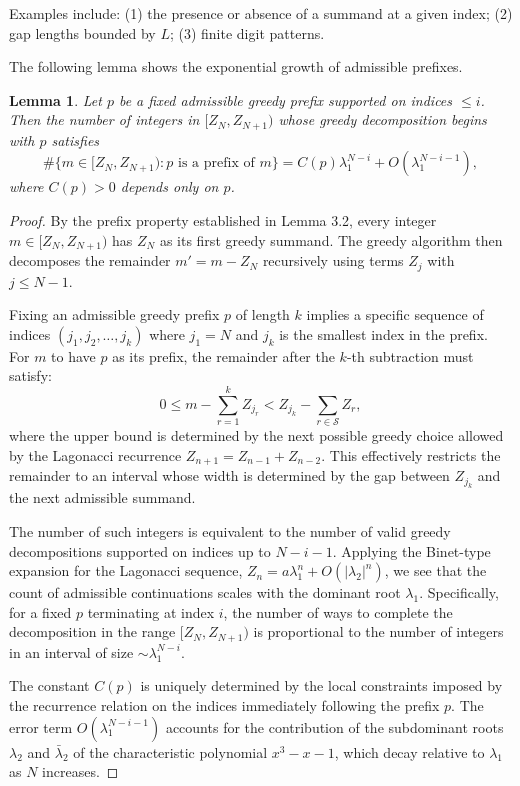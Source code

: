 \documentclass[11pt]{amsart}
\theoremstyle{plain}
\numberwithin{equation}{section} %
\newtheorem{lemma}[thm]{Lemma}
\numberwithin{table}{section} %
\numberwithin{figure}{section}
\begin{document}
	Examples include:
	(1) the presence or absence of a summand at a given index; (2) gap lengths bounded by $L$;
	(3) finite digit patterns.
	
	
	The following lemma shows the exponential growth of admissible prefixes.
	
	\begin{lemma}
		\label{lem:PrefixGrowth}
		Let $p$ be a fixed admissible greedy prefix supported on indices $\le i$. Then the number of integers in $[Z_{N}, Z_{N+1})$ whose greedy decomposition begins with $p$ satisfies
		\[
		\#\{m \in [Z_{N}, Z_{N+1}) : p \text{ is a prefix of } m\} = C(p) \lambda_1^{N-i} + O(\lambda_1^{N-i-1}),
		\]
		where $C(p) > 0$ depends only on $p$.
	\end{lemma}
	
	\begin{proof}
		By the prefix property established in Lemma 3.2, every integer $m \in [Z_{N}, Z_{N+1})$ has $Z_N$ as its first greedy summand. The greedy algorithm then decomposes the remainder $m' = m - Z_N$ recursively using terms $Z_j$ with $j \le N-1$.
		
		Fixing an admissible greedy prefix $p$ of length $k$ implies a specific sequence of indices $(j_1, j_2, \dots, j_k)$ where $j_1 = N$ and $j_k$ is the smallest index in the prefix. For $m$ to have $p$ as its prefix, the remainder after the $k$-th subtraction must satisfy:
		\[
		0 \le m - \sum_{r=1}^{k} Z_{j_r} < Z_{j_k} - \sum_{r \in \mathcal{S}} Z_r,
		\]
		where the upper bound is determined by the next possible greedy choice allowed by the Lagonacci recurrence $Z_{n+1} = Z_{n-1} + Z_{n-2}$. This effectively restricts the remainder to an interval whose width is determined by the gap between $Z_{j_k}$ and the next admissible summand.
		
		The number of such integers is equivalent to the number of valid greedy decompositions supported on indices up to $N-i-1$. Applying the Binet-type expansion for the Lagonacci sequence, $Z_n = a \lambda_1^n + O(|\lambda_2|^n)$, we see that the count of admissible continuations scales with the dominant root $\lambda_1$. Specifically, for a fixed $p$ terminating at index $i$, the number of ways to complete the decomposition in the range $[Z_N, Z_{N+1})$ is proportional to the number of integers in an interval of size $\sim \lambda_1^{N-i}$.
		
		The constant $C(p)$ is uniquely determined by the local constraints imposed by the recurrence relation on the indices immediately following the prefix $p$. The error term $O(\lambda_1^{N-i-1})$ accounts for the contribution of the subdominant roots $\lambda_2$ and ${\bar \lambda}_2$ of the characteristic polynomial $x^3 - x - 1$, which decay relative to $\lambda_1$ as $N$ increases.
	\end{proof}
	
\end{document}
